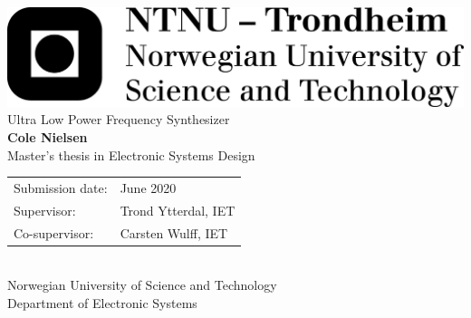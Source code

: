 	\thispagestyle{firstpage}
	\fontfamily{\sfdefault}\selectfont 
	\includegraphics[width=0.5\linewidth]{logo_ntnu_eng_black.png} \\
	\vspace{8em}
	\huge Ultra Low Power Frequency Synthesizer\\	
	\vspace{3em}
	\huge \textbf{Cole Nielsen}\\
	\vspace{12em}
	\large%
	Master's thesis in Electronic Systems Design\\
	\vspace{4pt}
	\FloatBarrier

	\def\arraystretch{1.3}
	\setlength{\tabcolsep}{1em}
	\begin{tabular}{@{} l  l}
	Submission date: & June 2020\\
	Supervisor: & Trond Ytterdal, IET\\
	Co-supervisor: & Carsten Wulff, IET\\
	\end{tabular} \\
	\FloatBarrier
	\vspace{3em}
	Norwegian University of Science and Technology \\ 
	\vspace{4pt}Department of Electronic Systems\\
	
